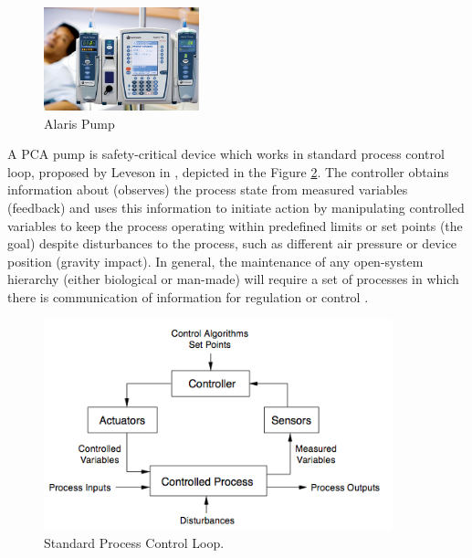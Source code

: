 \begin{figure}
  \begin{center}
    \includegraphics[width=0.4\textwidth]{figures/alaris-pump.png}
  \end{center}
  \caption{Alaris Pump}
  \label{figure:alaris-pump}
\end{figure}

A PCA pump is safety-critical device which works in standard process control loop, proposed by Leveson in \cite{SaferWorld}, depicted in the Figure \ref{figure:control-loop}. The controller obtains information about (observes) the process state from measured variables (feedback) and uses this information to initiate action by manipulating controlled variables to keep the process operating within predefined limits or set points (the goal) despite disturbances to the process, such as different air pressure or device position (gravity impact). In general, the maintenance of any open-system hierarchy (either biological or man-made) will require a set of processes in which there is communication of information for regulation or control \cite{SaferWorld}.

\begin{figure}[ht]%
    \begin{center}
    	\includegraphics[width=0.9\textwidth]{figures/safety-critical-loop.png}    	
    \end{center}
    \caption{Standard Process Control Loop.}
    \label{figure:control-loop}
\end{figure}

